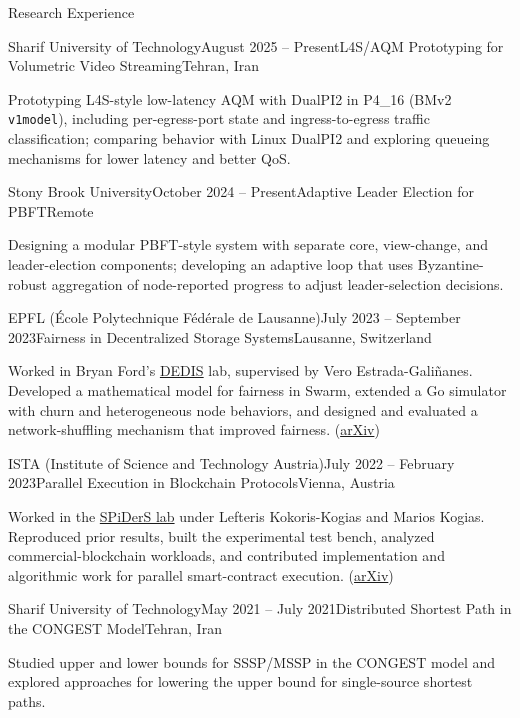 \documentclass[11pt]{resume}
\begin{document}
\begin{rSection}{Research Experience}
  \vspace{4pt}
  \begin{rSubsection}{Sharif University of Technology}{August 2025 -- Present}{L4S/AQM Prototyping for Volumetric Video Streaming}{Tehran, Iran}
    \item Prototyping L4S-style low-latency AQM with DualPI2 in P4\_16 (BMv2 \texttt{v1model}), including per-egress-port state and ingress-to-egress traffic classification; comparing behavior with Linux DualPI2 and exploring queueing mechanisms for lower latency and better QoS.
  \end{rSubsection}
  \begin{rSubsection}{Stony Brook University}{October 2024 -- Present}{Adaptive Leader Election for PBFT}{Remote}
    \item Designing a modular PBFT-style system with separate core, view-change, and leader-election components; developing an adaptive loop that uses Byzantine-robust aggregation of node-reported progress to adjust leader-selection decisions.
  \end{rSubsection}
  \begin{rSubsection}{EPFL (École Polytechnique Fédérale de Lausanne)}{July 2023 -- September 2023}{Fairness in Decentralized Storage Systems}{Lausanne, Switzerland}
    \item Worked in Bryan Ford's \href{https://www.epfl.ch/labs/dedis/}{DEDIS} lab, supervised by Vero Estrada-Galiñanes. Developed a mathematical model for fairness in Swarm, extended a Go simulator with churn and heterogeneous node behaviors, and designed and evaluated a network-shuffling mechanism that improved fairness. (\href{https://arxiv.org/abs/2307.02231}{arXiv})
  \end{rSubsection}

  \pagebreak

  \begin{rSubsection}{ISTA (Institute of Science and Technology Austria)}{July 2022 -- February 2023}{Parallel Execution in Blockchain Protocols}{Vienna, Austria}
    \item Worked in the \href{https://ist.ac.at/en/research/kokoris-group/}{SPiDerS lab} under Lefteris Kokoris-Kogias and Marios Kogias. Reproduced prior results, built the experimental test bench, analyzed commercial-blockchain workloads, and contributed implementation and algorithmic work for parallel smart-contract execution. (\href{https://arxiv.org/abs/2401.14278}{arXiv})
  \end{rSubsection}
  \begin{rSubsection}{Sharif University of Technology}{May 2021 -- July 2021}{Distributed Shortest Path in the CONGEST Model}{Tehran, Iran}
    \item Studied upper and lower bounds for SSSP/MSSP in the CONGEST model and explored approaches for lowering the upper bound for single-source shortest paths.
  \end{rSubsection}
\end{rSection}
\end{document}
